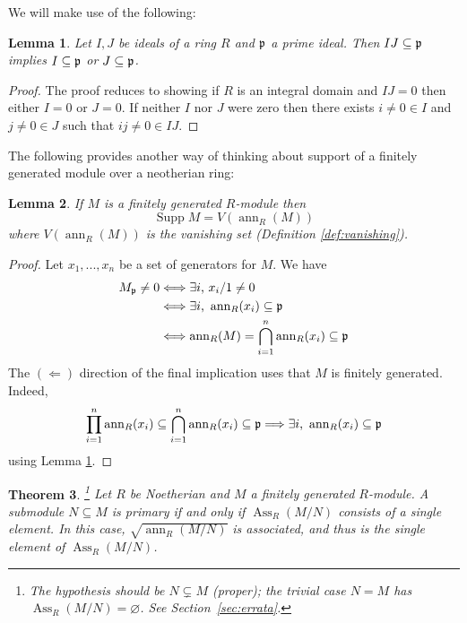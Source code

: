 \documentclass[12pt]{article}
\theoremstyle{plain}
\newtheorem{thm}{Theorem}[subsection] %
\newtheorem{lemma}[thm]{Lemma}
\theoremstyle{definition}
\begin{document}
We will make use of the following:
\begin{lemma}
\label{lem:product}
Let $I,J$ be ideals of a ring $R$ and $\frak{p}$ a prime ideal. Then $IJ \subseteq \frak{p}$ implies $I \subseteq \frak{p}$ or $J \subseteq \frak{p}$.
\end{lemma}
\begin{proof}
The proof reduces to showing if $R$ is an integral domain and $IJ = 0$ then either $I = 0$ or $J = 0$. If neither $I$ nor $J$ were zero then there exists $i\neq 0 \in I$ and $j\neq 0 \in J$ such that $ij \neq 0 \in IJ$.
\end{proof}
The following provides another way of thinking about support of a finitely generated module over a neotherian ring:
\begin{lemma}
\label{lem:support_vanishing}
If $M$ is a finitely generated $R$-module then \[\operatorname{Supp}M = V(\operatorname{ann}_R(M))\]
where $V(\operatorname{ann}_R(M))$ is the vanishing set (Definition \ref{def:vanishing}).
\end{lemma}
\begin{proof}
Let $x_1,...,x_n$ be a set of generators for $M$. We have
\begin{align*}
    M_\frak{p} \neq 0 &\Longleftrightarrow \exists i\text{, }x_i/1 \neq 0\\
    &\Longleftrightarrow \exists i\text{, }\operatorname{ann}_R(x_i) \subseteq \frak{p}\\
    &\Longleftrightarrow \operatorname{ann}_R(M) = \bigcap_{i = 1}^n \operatorname{ann}_R(x_i) \subseteq \frak{p}
\end{align*}
The $(\Longleftarrow)$ direction of the final implication uses that $M$ is finitely generated. Indeed, \[\prod_{i = 1}^n \operatorname{ann}_R(x_i) \subseteq \bigcap_{i = 1}^n\operatorname{ann}_R(x_i) \subseteq \frak{p} \Longrightarrow \exists i\text{, }\operatorname{ann}_R(x_i) \subseteq \frak{p}\]
using Lemma \ref{lem:product}.
\end{proof}
\begin{thm}
\label{thm:primary_single_elt}\footnote{The hypothesis should be $N\subsetneq M$ (proper); the trivial case $N=M$ has $\operatorname{Ass}_R(M/N)=\varnothing$. See Section~\ref{sec:errata}.}
Let $R$ be Noetherian and $M$ a finitely generated $R$-module. A submodule $N \subseteq M$ is primary if and only if $\operatorname{Ass}_R(M/N)$ consists of a single element. In this case, $\sqrt{\operatorname{ann}_R(M/N)}$ is associated, and thus is the single element of $\operatorname{Ass}_R(M/N)$.
\end{thm}
\end{document}
